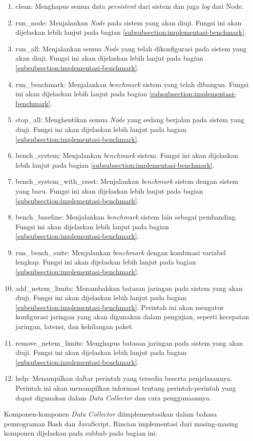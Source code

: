 \begin{enumerate}
  \item clean: Menghapus semua data \textit{persistent} dari sistem dan juga \textit{log} dari Node.
  \item run\_node: Menjalankan \textit{Node} pada sistem yang akan diuji. Fungsi ini akan dijelaskan lebih lanjut pada bagian \ref{subsubsection:implementasi-benchmark}.
  \item run\_all: Menjalankan semua \textit{Node} yang telah dikonfigurasi pada sistem yang akan diuji. Fungsi ini akan dijelaskan lebih lanjut pada bagian \ref{subsubsection:implementasi-benchmark}.
  \item run\_benchmark: Menjalankan \textit{benchmark} sistem yang telah dibangun. Fungsi ini akan dijelaskan lebih lanjut pada bagian \ref{subsubsection:implementasi-benchmark}.
  \item stop\_all: Menghentikan semua \textit{Node} yang sedang berjalan pada sistem yang diuji. Fungsi ini akan dijelaskan lebih lanjut pada bagian \ref{subsubsection:implementasi-benchmark}.
  \item bench\_system: Menjalankan \textit{benchmark} sistem. Fungsi ini akan dijelaskan lebih lanjut pada bagian \ref{subsubsection:implementasi-benchmark}.
  \item bench\_system\_with\_reset: Menjalankan \textit{benchmark} sistem dengan sistem yang baru. Fungsi ini akan dijelaskan lebih lanjut pada bagian \ref{subsubsection:implementasi-benchmark}.
  \item bench\_baseline: Menjalankan \textit{benchmark} sistem lain sebagai pembanding. Fungsi ini akan dijelaskan lebih lanjut pada bagian \ref{subsubsection:implementasi-benchmark}.
  \item run\_bench\_suite: Menjalankan \textit{benchmark} dengan kombinasi variabel lengkap. Fungsi ini akan dijelaskan lebih lanjut pada bagian \ref{subsubsection:implementasi-benchmark}.
  \item add\_netem\_limits: Menambahkan batasan jaringan pada sistem yang akan diuji. Fungsi ini akan dijelaskan lebih lanjut pada bagian \ref{subsubsection:implementasi-benchmark}. Perintah ini akan mengatur konfigurasi jaringan yang akan digunakan dalam pengujian, seperti kecepatan jaringan, latensi, dan kehilangan paket.
  \item remove\_netem\_limits: Menghapus batasan jaringan pada sistem yang akan diuji. Fungsi ini akan dijelaskan lebih lanjut pada bagian \ref{subsubsection:implementasi-benchmark}.
  \item help: Menampilkan daftar perintah yang tersedia beserta penjelasannya. Perintah ini akan menampilkan informasi tentang perintah-perintah yang dapat digunakan dalam \textit{Data Collector} dan cara penggunaannya.
\end{enumerate}

Komponen-komponen \textit{Data Collector} diimplementasikan dalam bahasa pemrograman Bash dan JavaScript. Rincian implementasi dari masing-masing komponen dijelaskan pada subbab pada bagian ini.


